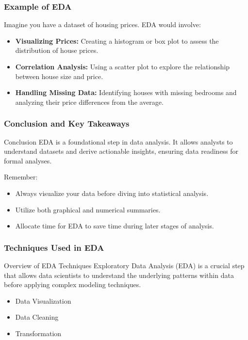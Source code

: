 \documentclass[aspectratio=169]{beamer}
\begin{document}
\begin{frame}[fragile]
    \frametitle{Example of EDA}
    Imagine you have a dataset of housing prices. EDA would involve:
    \begin{itemize}
        \item \textbf{Visualizing Prices:} Creating a histogram or box plot to assess the distribution of house prices.
        \item \textbf{Correlation Analysis:} Using a scatter plot to explore the relationship between house size and price.
        \item \textbf{Handling Missing Data:} Identifying houses with missing bedrooms and analyzing their price differences from the average.
    \end{itemize}
\end{frame}

\begin{frame}[fragile]
    \frametitle{Conclusion and Key Takeaways}
    \begin{block}{Conclusion}
        EDA is a foundational step in data analysis. It allows analysts to understand datasets and derive actionable insights, ensuring data readiness for formal analyses.
    \end{block}
    \begin{block}{Remember:}
        \begin{itemize}
            \item Always visualize your data before diving into statistical analysis.
            \item Utilize both graphical and numerical summaries.
            \item Allocate time for EDA to save time during later stages of analysis.
        \end{itemize}
    \end{block}
\end{frame}

\begin{frame}
  \frametitle{Techniques Used in EDA}
  \begin{block}{Overview of EDA Techniques}
    Exploratory Data Analysis (EDA) is a crucial step that allows data scientists to understand the underlying patterns within data before applying complex modeling techniques.
  \end{block}
  \begin{itemize}
    \item Data Visualization
    \item Data Cleaning
    \item Transformation
  \end{itemize}
\end{frame}
\end{document}
